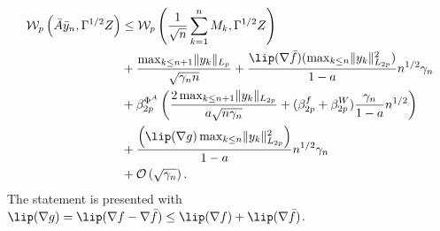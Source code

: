 \documentclass[11pt]{article}
\begin{document}
\begin{equation}
\begin{split}
    \mathcal{W}_{p} \left( \bar{A} \bar{y}_n, \Gamma^{1/2}Z \right) 
    &\leq 
    \mathcal{W}_{p} \left(\frac{1}{\sqrt{n}} \sum_{k=1}^n M_k, \Gamma^{1/2}Z \right)
    \\ 
    &+    
    \frac{\max_{k \leq n+1} \lVert y_k \rVert_{L_p}}{\sqrt{\gamma_n n}}
    +
    \frac{\lip(\nabla \bar{f}) (\max_{k \leq n} \lVert y_k \rVert^2_{L_{2p}})}{1-a} n^{1/2} \gamma_n
    \\ 
    &
    + \beta_{2p}^{\Phi^A}
    \left(\frac{2\max_{k \leq {n+1}} \lVert y_k \rVert_{L_{2p}} }{a \sqrt{n \gamma_n}} + (\beta_{2p}^f + \beta_{2p}^W) \frac{\gamma_n}{1-a} n^{1/2} \right)
    \\ 
    &+
    \frac{\left(\lip(\nabla g) \max_{k \leq n} \lVert y_k \rVert^2_{L_{2p}} \right)}{1-a} n^{1/2} \gamma_n
    \\ &
    + \mathcal{O}\left(\sqrt{\gamma_n}\right) .     
\end{split}
\end{equation}
The statement is presented with $\lip(\nabla g) = \lip(\nabla f - \nabla \bar{f}) \leq \lip(\nabla f) + \lip(\nabla \bar{f})$.
\end{document}
